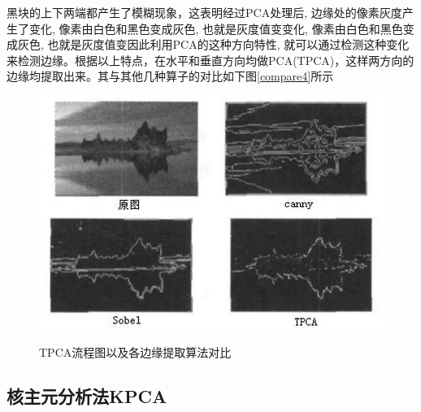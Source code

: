\documentclass[10pt,a4paper]{article}
\begin{document}
\begin{CJK*}{UTF8}{song}
黑块的上下两端都产生了模糊现象，这表明经过PCA处理后, 边缘处的像素灰度产生了变化, 像素由白色和黑色变成灰色, 也就是灰度值变变化, 像素由白色和黑色变成灰色, 也就是灰度值变因此利用PCA的这种方向特性, 就可以通过检测这种变化来检测边缘。根据以上特点，在水平和垂直方向均做PCA(TPCA)，这样两方向的边缘均提取出来。其与其他几种算子的对比如下图\ref{compare4}所示
\begin{figure}[!htbp]
	\centering
	\caption{TPCA流程图以及各边缘提取算法对比}  
		\includegraphics[scale=0.55]{figs/compare4.png}
    	\label{fig:compare4}
\end{figure}


\subsection{核主元分析法KPCA}

\end{CJK*}
\end{document}
